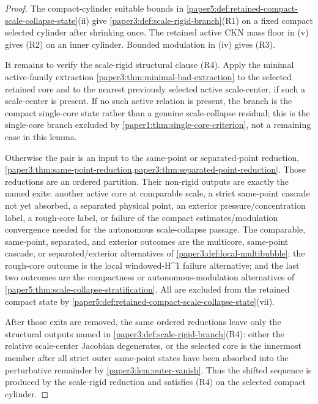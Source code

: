 \documentclass[11pt]{amsart}
\def\({}%
\def\){}%
\theoremstyle{plain}
\theoremstyle{definition}
\theoremstyle{remark}
\begin{document}
\begin{proof}
The compact-cylinder suitable bounds in
\cref{paper5:def:retained-compact-scale-collapse-state}\textup{(ii)} give
\cref{paper3:def:scale-rigid-branch}\textup{(R1)} on a fixed compact selected
cylinder after shrinking once.  The retained active CKN mass floor in
\textup{(v)} gives \textup{(R2)} on an inner cylinder.  Bounded modulation in
\textup{(iv)} gives \textup{(R3)}.

It remains to verify the scale-rigid structural clause \textup{(R4)}.  Apply
the minimal active-family extraction
\cref{paper3:thm:minimal-bad-extraction} to the selected retained core and to
the nearest previously selected active scale-center, if such a scale-center is
present.  If no such active relation is present, the branch is the compact
single-core state rather than a genuine scale-collapse residual; this is the
single-core branch excluded by \cref{paper1:thm:single-core-criterion}, not a
remaining case in this lemma.

Otherwise the pair is an input to the same-point or separated-point reduction,
\cref{paper3:thm:same-point-reduction,paper3:thm:separated-point-reduction}.
Those reductions are an ordered partition.  Their non-rigid outputs are exactly
the named exits: another active core at comparable scale, a strict same-point
cascade not yet absorbed, a separated physical point, an exterior
pressure/concentration label, a rough-core label, or failure of the compact
estimates/modulation convergence needed for the autonomous scale-collapse
passage.  The comparable, same-point, separated, and exterior outcomes are the
multicore, same-point cascade, or separated/exterior alternatives of
\cref{paper3:def:local-multibubble}; the rough-core outcome is the local
windowed-\(H^1\) failure alternative; and the last two outcomes are the
compactness or autonomous-modulation alternatives of
\cref{paper5:thm:scale-collapse-stratification}.  All are excluded from the
retained compact state by
\cref{paper5:def:retained-compact-scale-collapse-state}\textup{(vii)}.

After those exits are removed, the same ordered reductions leave only the
structural outputs named in
\cref{paper3:def:scale-rigid-branch}\textup{(R4)}: either the relative
scale-center Jacobian degenerates, or the selected core is the innermost member
after all strict outer same-point states have been absorbed into the
perturbative remainder by \cref{paper3:lem:outer-vanish}.  Thus the shifted
sequence is produced by the scale-rigid reduction and satisfies \textup{(R4)}
on the selected compact cylinder.
\end{proof}
\end{document}
